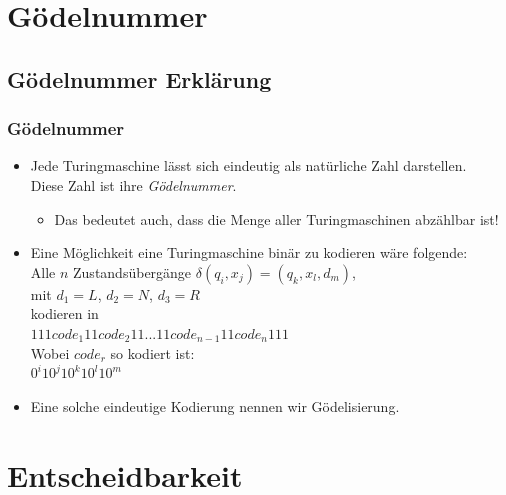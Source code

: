 



\section{Gödelnummer}
\subsection{Gödelnummer Erklärung}
\begin{frame}
	\frametitle{Gödelnummer}
	\begin{itemize}
		\item Jede Turingmaschine lässt sich eindeutig als natürliche Zahl darstellen. \\ Diese Zahl ist ihre \emph{Gödelnummer}.
		\begin{itemize}
			\item Das bedeutet auch, dass die Menge aller Turingmaschinen abzählbar ist!
		\end{itemize}
		\item Eine Möglichkeit eine Turingmaschine binär zu kodieren wäre folgende: \\
		Alle $n$ Zustandsübergänge $\delta(q_i, x_j) = (q_k, x_l, d_m)$, \\
		mit $d_1 = L$, $d_2 = N$, $d_3 = R$ \\
		kodieren in \\
		$111 code_1 11 code_2 11 ... 11 code_{n-1} 11 code_n 111$ \\
		Wobei $code_r$ so kodiert ist: \\
		$0^i 1 0^j 1 0^k 1 0^l 1 0^m$
		\item Eine solche eindeutige Kodierung nennen wir Gödelisierung.
	\end{itemize}
\end{frame}

\section{Entscheidbarkeit}
